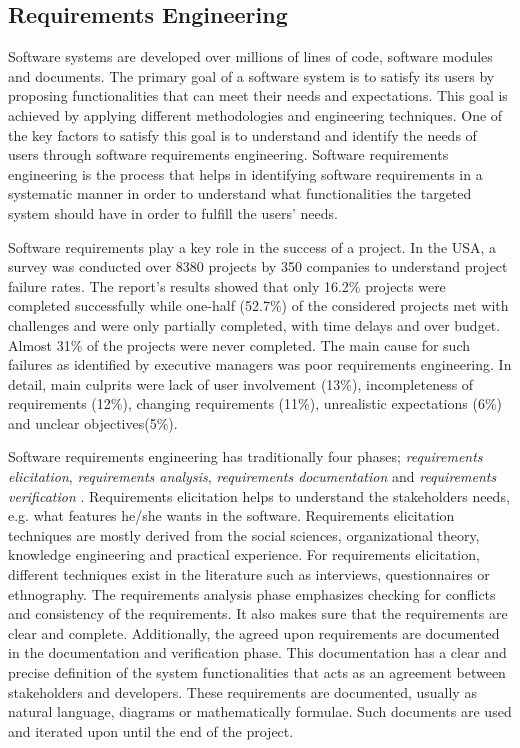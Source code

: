 \subsection{Requirements Engineering}

Software systems are developed over millions of lines of code, software modules
and documents. The primary goal of a software system is to satisfy its users by
proposing functionalities that can meet their needs and expectations. This goal
is achieved by applying different methodologies and engineering techniques. One
of the key factors to satisfy this goal is to understand and identify the needs
of users through software requirements engineering. Software requirements
engineering is the process that helps in identifying software requirements in a
systematic manner in order to understand what functionalities the targeted
system should have in order to fulfill the users' needs.\par Software
requirements play a key role in the success of a project. In the USA, a survey was conducted over
8380 projects by 350 companies to understand project failure rates. The report's
results \cite{StandishReport} showed that only 16.2\% projects were completed
successfully while one-half (52.7\%) of the considered projects met with
challenges and were only partially completed, with time delays and over
budget. Almost 31\% of the projects were never completed. The main cause for
such failures as identified by executive managers was poor requirements
engineering. In detail, main culprits were lack of user involvement (13\%),
incompleteness of requirements (12\%), changing requirements (11\%), unrealistic
expectations (6\%) and unclear objectives(5\%).

Software requirements engineering has traditionally four phases;
\emph{requirements elicitation}, \emph{requirements analysis},
\emph{requirements documentation} and \emph{requirements verification} \cite
{Kotonya:1998}. Requirements elicitation \cite{Coughlan:2002, Zowghi2005} helps
to understand the stakeholders needs, e.g. what features he/she wants in the software.
Requirements elicitation techniques are mostly derived from the social sciences,
organizational theory, knowledge engineering and practical experience. For
requirements elicitation, different techniques exist in the literature such as
interviews, questionnaires or ethnography.
The requirements analysis \cite{Nuseibeh:2000} phase emphasizes checking for
conflicts and consistency of the requirements. It also makes sure that the
requirements are clear and complete. Additionally, the agreed upon requirements
are documented in the documentation and verification phase. This documentation
has a clear and precise definition of the system functionalities that acts as an
agreement between stakeholders and developers. These requirements are
documented, usually as natural language, diagrams or mathematically formulae.
Such documents are used and iterated upon until the end of the project.

